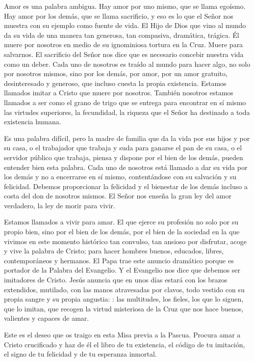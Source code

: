 \begin{body}
\newpage 
{}

Amor es una palabra ambigua. Hay amor por uno mismo, que se llama egoísmo. Hay amor por los demás, que se llama sacrificio, y eso es lo que el Señor nos muestra con su ejemplo como fuente de vida. El Hijo de Dios que vino al mundo da su vida de una manera tan generosa, tan compasiva, dramática, trágica. Él muere por nosotros en medio de su ignominiosa tortura en la Cruz. Muere para salvarnos. El sacrificio del Señor nos dice que es necesario concebir nuestra vida como un deber. Cada uno de nosotros es traído al mundo para hacer algo, no solo por nosotros mismos, sino por los demás, por amor, por un amor gratuito, desinteresado y generoso, que incluso cuesta la propia existencia. Estamos llamados imitar a Cristo que muere por nosotros. También nosotros estamos llamados a ser como el grano de trigo que se entrega para encontrar en sí mismo las virtudes superiores, la fecundidad, la riqueza que el Señor ha destinado a toda existencia humana.

Es una palabra difícil, pero la madre de familia que da la vida por sus hijos y por su casa, o el trabajador que trabaja y suda para ganarse el pan de su casa, o el servidor público que trabaja, piensa y dispone por el bien de los demás, pueden entender bien esta palabra. Cada uno de nosotros está llamado a dar su vida por los demás y no a encerrarse en sí mismo, contentándose con su salvación y su felicidad. Debemos proporcionar la felicidad y el bienestar de los demás incluso a costa del don de nosotros mismos. El Señor nos enseña la gran ley del amor verdadero, la ley de morir para vivir.

Estamos llamados a vivir para amar. El que ejerce su profesión no solo por su propio bien, sino por el bien de los demás, por el bien de la sociedad en la que vivimos en este momento histórico tan convulso, tan ansioso por disfrutar, acoge y vive la palabra de Cristo; para hacer hombres buenos, educados, libres, contemporáneos y hermanos. El Papa trae este anuncio dramático porque es portador de la Palabra del Evangelio. Y el Evangelio nos dice que debemos ser imitadores de Cristo. Jesús anuncia que en unos días estará con los brazos extendidos, mutilado, con las manos atravesadas por clavos, todo vestido con su propia sangre y su propia angustia: : las multitudes, los fieles, los que lo siguen, que lo imitan, que recogen la virtud misteriosa de la Cruz que nos hace buenos, valientes y capaces de amar.

Este es el deseo que os traigo en esta Misa previa a la Pascua. Procura amar a Cristo crucificado y haz de él el libro de tu existencia, el código de tu imitación, el signo de tu felicidad y de tu esperanza inmortal.
\end{body}

